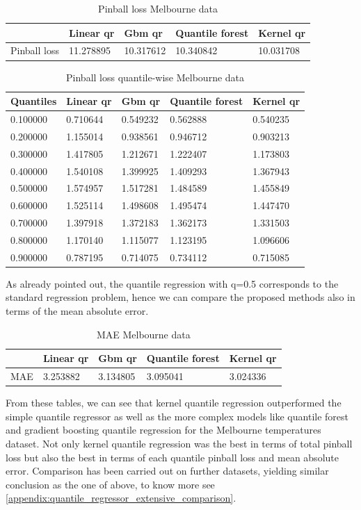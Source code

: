 \begin{table}[!h]
\caption{Pinball loss Melbourne data}
\begin{tabular}{lllll}
    \toprule
     & Linear qr & Gbm qr & Quantile forest & Kernel qr \\
    \midrule
    Pinball loss & 11.278895 & 10.317612 & 10.340842 & 10.031708 \\
    \bottomrule
    \end{tabular}
\end{table}

\begin{table}[!h]
    \caption{Pinball loss quantile-wise Melbourne data}
    \begin{tabular}{lllll}
    \toprule
    Quantiles & Linear qr & Gbm qr & Quantile forest & Kernel qr \\
    \midrule
    0.100000 & 0.710644 & 0.549232 & 0.562888 & 0.540235 \\
    0.200000 & 1.155014 & 0.938561 & 0.946712 & 0.903213 \\
    0.300000 & 1.417805 & 1.212671 & 1.222407 & 1.173803 \\
    0.400000 & 1.540108 & 1.399925 & 1.409293 & 1.367943 \\
    0.500000 & 1.574957 & 1.517281 & 1.484589 & 1.455849 \\
    0.600000 & 1.525114 & 1.498608 & 1.495474 & 1.447470 \\
    0.700000 & 1.397918 & 1.372183 & 1.362173 & 1.331503 \\
    0.800000 & 1.170140 & 1.115077 & 1.123195 & 1.096606 \\
    0.900000 & 0.787195 & 0.714075 & 0.734112 & 0.715085 \\
    \bottomrule
    \end{tabular}
\end{table}
As already pointed out, the quantile regression with q=0.5 corresponds to the standard regression problem, hence we can compare the proposed methods also in terms of the mean absolute error.
\begin{table}[!h]
\caption{MAE Melbourne data}
\begin{tabular}{lllll}
    \toprule
     & Linear qr & Gbm qr & Quantile forest & Kernel qr \\
    \midrule
    MAE & 3.253882 & 3.134805 & 3.095041 & 3.024336 \\
    \bottomrule
    \end{tabular}
\end{table}  
From these tables, we can see that kernel quantile regression outperformed the simple quantile regressor as well as the more complex models like quantile forest and gradient boosting quantile regression for the Melbourne temperatures dataset. Not only kernel quantile regression was the best in terms of total pinball loss but also the best in terms of each quantile pinball loss and mean absolute error.
Comparison has been carried out on further datasets, yielding similar conclusion as the one of above, to know more see \ref{appendix:quantile_regressor_extensive_comparison}.


